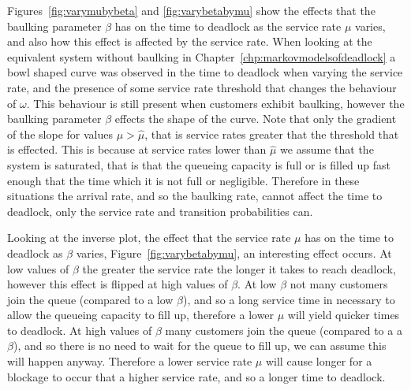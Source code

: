 \documentclass{article}
\begin{document}
Figures~\ref{fig:varymubybeta} and \ref{fig:varybetabymu} show the effects that the baulking parameter $\beta$ has on the time to deadlock as the service rate $\mu$ varies, and also how this effect is affected by the service rate.
When looking at the equivalent system without baulking in Chapter~\ref{chp:markovmodelsofdeadlock} a bowl shaped curve was observed in the time to deadlock when varying the service rate, and the presence of some service rate threshold that changes the behaviour of $\omega$.
This behaviour is still present when customers exhibit baulking, however the baulking parameter $\beta$ effects the shape of the curve. Note that only the gradient of the slope for values $\mu > \hat{\mu}$, that is service rates greater that the threshold that is effected.
This is because at service rates lower than $\hat{\mu}$ we assume that the system is saturated, that is that the queueing capacity is full or is filled up fast enough that the time which it is not full or negligible.
Therefore in these situations the arrival rate, and so the baulking rate, cannot affect the time to deadlock, only the service rate and transition probabilities can.

Looking at the inverse plot, the effect that the service rate $\mu$ has on the time to deadlock as $\beta$ varies, Figure~\ref{fig:varybetabymu}, an interesting effect occurs.
At low values of $\beta$ the greater the service rate the longer it takes to reach deadlock, however this effect is flipped at high values of $\beta$.
At low $\beta$ not many customers join the queue (compared to a low $\beta$), and so a long service time in necessary to allow the queueing capacity to fill up, therefore a lower $\mu$ will yield quicker times to deadlock.
At high values of $\beta$ many customers join the queue (compared to a a $\beta$), and so there is no need to wait for the queue to fill up, we can assume this will happen anyway.
Therefore a lower service rate $\mu$ will cause longer for a blockage to occur that a higher service rate, and so a longer time to deadlock.
\end{document}
